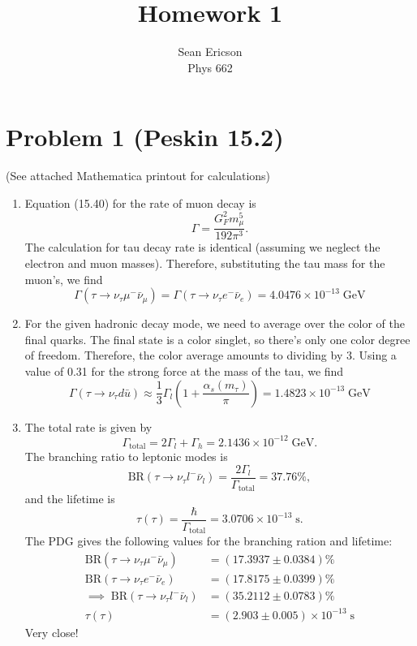 \documentclass[12pt]{article}
\begin{document}
\title{Homework 1}
\author{Sean Ericson \\ Phys 662}
\maketitle
\section*{Problem 1 (Peskin 15.2)}
(See attached Mathematica printout for calculations)
\begin{enumerate}[label=(\alph*)]
    \item Equation (15.40) for the rate of muon decay is 
    \[ \Gamma = \frac{G_F^2m_\mu^5}{192\pi^3}. \]
    The calculation for tau decay rate is identical (assuming we neglect the electron and muon masses). Therefore, substituting the tau mass for the muon's, we find
    \[ \Gamma(\tau \to \nu_\tau \mu^- \bar{\nu}_\mu) = \Gamma(\tau \to \nu_\tau e^- \bar{\nu}_e) = 4.0476 \times 10^{-13} \;\text{GeV} \]
    \item For the given hadronic decay mode, we need to average over the color of the final quarks. The final state is a color singlet, so there's only one color degree of freedom. Therefore, the color average amounts to dividing by 3. Using a value of 0.31 for the strong force at the mass of the tau, we find
    \[ \Gamma(\tau \to \nu_\tau d\bar{u}) \approx \frac{1}{3}\Gamma_l\left(1 + \frac{\alpha_s(m_\tau)}{\pi}\right) = 1.4823 \times 10^{-13} \;\text{GeV} \] 
    \item The total rate is given by
    \[ \Gamma_\text{total} = 2\Gamma_l + \Gamma_h = 2.1436 \times 10^{-12} \;\text{GeV}. \]
    The branching ratio to leptonic modes is
    \[ \text{BR}(\tau \to \nu_\tau l^- \bar{\nu}_l) = \frac{2\Gamma_l}{\Gamma_\text{total}} = 37.76\%, \]
    and the lifetime is
    \[ \tau(\tau) = \frac{\hbar}{\Gamma_\text{total}} = 3.0706 \times 10^{-13} \;\text{s}. \]
    The PDG gives the following values for the branching ration and lifetime:
    \begin{align}
        \text{BR}(\tau \to \nu_\tau\mu^-\bar{\nu}_\mu) &= (17.3937\pm0.0384)\% \\
        \text{BR}(\tau \to \nu_\tau e^- \bar{\nu}_e) &= (17.8175\pm0.0399)\% \\
        \implies \; \text{BR}(\tau \to \nu_\tau l^- \bar{\nu}_l) &= (35.2112\pm0.0783)\% \\
        \tau(\tau) &= (2.903 \pm0.005)  \times 10^{-13} \;\text{s}
    \end{align}
    Very close!
\end{enumerate}
\end{document}
